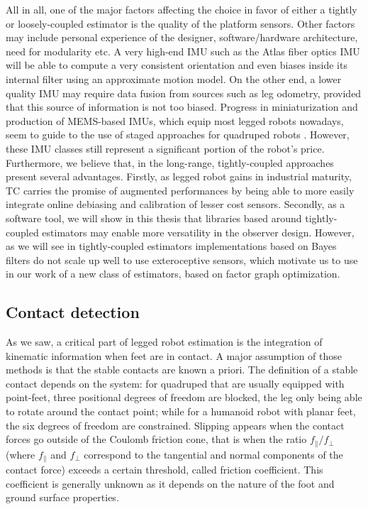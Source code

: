 All in all, one of the major factors affecting the choice in favor of either a tightly or loosely-coupled estimator is the quality of the platform sensors. Other factors may include personal experience of the designer, software/hardware architecture, need for modularity etc. 
A very high-end IMU such as the Atlas fiber optics IMU will be able to compute a very consistent orientation and even biases inside its internal 
filter using an approximate motion model. On the other end, a lower quality IMU may require data fusion from sources such as leg odometry, 
provided that this source of information is not too biased. Progress in miniaturization and production of MEMS-based IMUs, which equip most 
legged robots nowadays, seem to guide to the use of staged approaches for quadruped robots \cite{bledt2018cheetah, leziart2021implementation}. 
However, these IMU classes still represent a significant portion of the robot's price. Furthermore, we believe that, in the long-range, tightly-coupled
approaches present several advantages. Firstly, as legged robot gains in industrial maturity, TC carries the promise of augmented performances by being able
to more easily integrate online debiasing and calibration of lesser cost sensors. Secondly, as a software tool, we will show in this thesis that libraries based
around tightly-coupled estimators may enable more versatility in the observer design. However, as we will see in  
tightly-coupled estimators implementations based on Bayes filters do not scale up well to use exteroceptive sensors, which motivate us to use in our work of a
new class of estimators, based on factor graph optimization.



\subsection{Contact detection}
As we saw, a critical part of legged robot estimation is the integration of kinematic information when feet are in contact. A major
assumption of those methods is that the stable contacts are known a priori. The definition of a stable contact depends on the system: for quadruped that 
are usually equipped with point-feet, three positional degrees of freedom are blocked, the leg only being able to rotate around the contact point; 
while for a humanoid robot with planar feet, the six degrees of freedom are constrained. Slipping appears when the contact forces go outside of the Coulomb friction cone, 
that is when the ratio $f_{\parallel}/f_{\perp}$ (where $f_{\parallel}$ and $f_{\perp}$ correspond to the tangential and normal components of the contact force) 
exceeds a certain threshold, called friction coefficient. 
This coefficient is generally unknown as it depends on the nature of the foot and ground surface properties.

